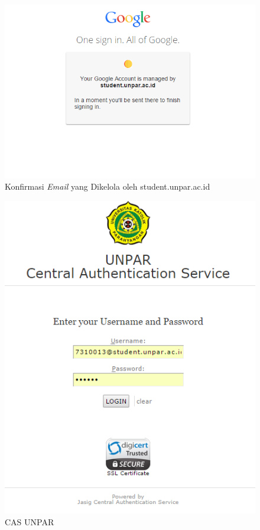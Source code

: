 \begin{figure}[H]
\centering
\includegraphics[scale=0.44]{Gambar/pengujian3.png}
\caption[Konfirmasi {\it Email} yang Dikelola oleh student.unpar.ac.id]{Konfirmasi {\it Email} yang Dikelola oleh student.unpar.ac.id}
\label{fig:konfirmasiemail}
\end{figure}

\begin{figure}[H]
\centering
\includegraphics[scale=0.44]{Gambar/pengujian4.png}
\caption[CAS UNPAR]{CAS UNPAR} 
\label{fig:casunpar}
\end{figure}

